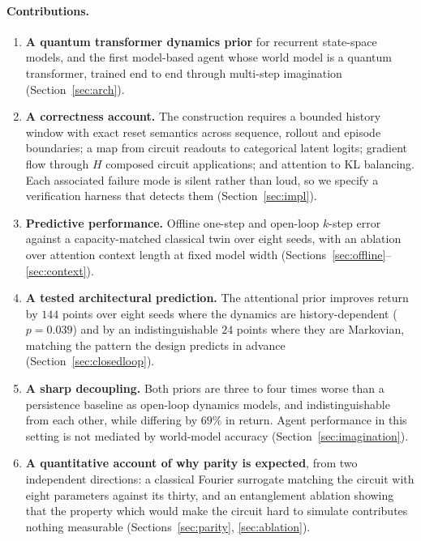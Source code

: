 \documentclass[11pt,onecolumn]{article}
\begin{document}
\paragraph{Contributions.}
\begin{enumerate}\itemsep3pt
\item \textbf{A quantum transformer dynamics prior} for recurrent
      state-space models, and the first model-based agent whose world
      model is a quantum transformer, trained end to end through
      multi-step imagination (Section~\ref{sec:arch}).
\item \textbf{A correctness account.} The construction requires a
      bounded history window with exact reset semantics across sequence,
      rollout and episode boundaries; a map from circuit readouts to
      categorical latent logits; gradient flow through $H$ composed
      circuit applications; and attention to KL balancing. Each
      associated failure mode is silent rather than loud, so we specify
      a verification harness that detects them
      (Section~\ref{sec:impl}).
\item \textbf{Predictive performance.} Offline one-step and open-loop
      $k$-step error against a capacity-matched classical twin over
      eight seeds, with an ablation over attention context length at
      fixed model width (Sections~\ref{sec:offline}--\ref{sec:context}).
\item \textbf{A tested architectural prediction.} The attentional
      prior improves return by $144$ points over eight seeds where the
      dynamics are history-dependent ($p = 0.039$) and by an
      indistinguishable $24$ points where they are Markovian, matching
      the pattern the design predicts in advance
      (Section~\ref{sec:closedloop}).
\item \textbf{A sharp decoupling.} Both priors are three to four
      times worse than a persistence baseline as open-loop dynamics
      models, and indistinguishable from each other, while differing by
      $69\%$ in return. Agent performance in this setting is not
      mediated by world-model accuracy
      (Section~\ref{sec:imagination}).
\item \textbf{A quantitative account of why parity is expected}, from
      two independent directions: a classical Fourier surrogate
      matching the circuit with eight parameters against its thirty,
      and an entanglement ablation showing that the property which
      would make the circuit hard to simulate contributes nothing
      measurable (Sections~\ref{sec:parity}, \ref{sec:ablation}).

\end{enumerate}
\end{document}
